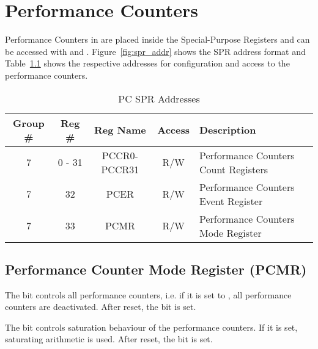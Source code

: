 \chapter{Performance Counters}
\label{chap:perf_count}

Performance Counters in \orion are placed inside the Special-Purpose Registers
and can be accessed with  and .
Figure~\ref{fig:spr_addr} shows the SPR address format and
Table~\ref{tab:pc_spr_addr} shows the respective addresses for configuration and
access to the performance counters.

\begin{table}[H]
 \caption{PC SPR Addresses}
 \label{tab:pc_spr_addr}
 \centering\begin{tabularx}{\textwidth}{@{}ccccX@{}} \toprule
   \textbf{Group \#} & \textbf{Reg \#} & Reg Name     & Access  & Description\\ \toprule
                   7 &  0 - 31         & PCCR0-PCCR31 & R/W     & Performance Counters Count Registers \\ \hline
                   7 &  32             & PCER         & R/W     & Performance Counters Event Register \\ \hline
                   7 &  33             & PCMR         & R/W     & Performance Counters Mode Register \\ \bottomrule
  \end{tabularx}
\end{table}


\section{Performance Counter Mode Register (PCMR)}


The  bit controls all performance counters, i.e. if it is set
to , all performance counters are deactivated.
After reset, the  bit is set.

The  bit controls saturation behaviour of the performance
counters. If it is set, saturating arithmetic is used.
After reset, the  bit is set.

